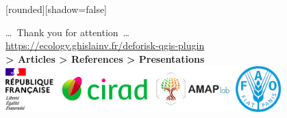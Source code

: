 \documentclass[10pt,table,dvipsnames,compress]{beamer}
\begin{document}
{
  [rounded][shadow=false]
  \begin{frame}[plain]
    \begin{block}{}
      \begin{center}
        \ldots~Thank you for attention~\ldots \\
        \url{https://ecology.ghislainv.fr/deforisk-qgis-plugin} \\
        \textbf{> Articles > References > Presentations} \\
        \includegraphics[width=0.8\textwidth]{figs/partners_logos}
      \end{center}
    \end{block}
  \end{frame}
}
\end{document}
